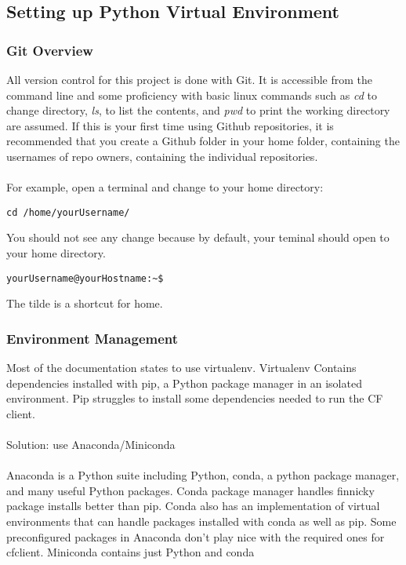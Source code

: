 \documentclass[12pt]{article}
\begin{document}
\subsection{Setting up Python Virtual Environment}
\subsubsection{Git Overview}
All version control for this project is done with Git. It is accessible from the command line and some proficiency with basic linux commands such as \textit{cd} to change directory, \textit{ls}, to list the contents, and \textit{pwd} to print the working directory are assumed. If this is your first time using Github repositories, it is recommended that you create a Github folder in your home folder, containing the usernames of repo owners, containing the individual repositories.
\\
\\
For example, open a terminal and change to your home directory:
\begin{verbatim}cd /home/yourUsername/ \end{verbatim}
You should not see any change because by default, your teminal should open to your home directory.
\begin{verbatim}yourUsername@yourHostname:~$ \end{verbatim}
The tilde is a shortcut for home.

\subsubsection{Environment Management}
Most of the documentation states to use virtualenv. Virtualenv Contains dependencies installed with pip, a Python package manager in an isolated environment. Pip struggles to install some dependencies needed to run the CF client.
\\\\    
Solution: use Anaconda/Miniconda
\\\\    	
Anaconda is a Python suite including Python, conda, a python package manager, and many useful Python packages. Conda package manager handles finnicky package installs better than pip. Conda also has an implementation of virtual environments that can handle packages installed with conda as well as pip. Some preconfigured packages in Anaconda don't play nice with the required ones for cfclient. Miniconda contains just Python and conda
\end{document}
